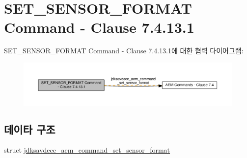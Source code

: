 \hypertarget{group__command__set__sensor__format}{}\section{S\+E\+T\+\_\+\+S\+E\+N\+S\+O\+R\+\_\+\+F\+O\+R\+M\+AT Command -\/ Clause 7.4.13.1}
\label{group__command__set__sensor__format}
S\+E\+T\+\_\+\+S\+E\+N\+S\+O\+R\+\_\+\+F\+O\+R\+M\+AT Command -\/ Clause 7.4.13.1에 대한 협력 다이어그램\+:
\nopagebreak
\begin{figure}[H]
\begin{center}
\leavevmode
\includegraphics[width=350pt]{group__command__set__sensor__format}
\end{center}
\end{figure}
\subsection*{데이타 구조}
\begin{DoxyCompactItemize}
\item 
struct \hyperlink{structjdksavdecc__aem__command__set__sensor__format}{jdksavdecc\+\_\+aem\+\_\+command\+\_\+set\+\_\+sensor\+\_\+format}
\end{DoxyCompactItemize}
